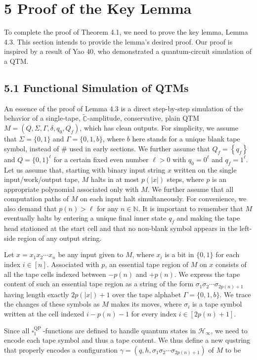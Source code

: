 \documentclass[10pt]{article}
\begin{document}
\section*{5 Proof of the Key Lemma}
To complete the proof of Theorem 4.1, we need to prove the key lemma, Lemma 4.3. This section intends to provide the lemma's desired proof. Our proof is inspired by a result of Yao 40, who demonstrated a quantum-circuit simulation of a QTM.

\subsection*{5.1 Functional Simulation of QTMs}
An essence of the proof of Lemma 4.3 is a direct step-by-step simulation of the behavior of a single-tape, $\tilde{\mathbb{C}}$-amplitude, conservative, plain QTM $M=\left(Q, \Sigma, \Gamma, \delta, q_{0}, Q_{f}\right)$, which has clean outputs. For simplicity, we assume that $\Sigma=\{0,1\}$ and $\Gamma=\{0,1, b\}$, where $b$ here stands for a unique blank tape symbol, instead of $\#$ used in early sections. We further assume that $Q_{f}=\left\{q_{f}\right\}$ and $Q=\{0,1\}^{\ell}$ for a certain fixed even number $\ell>0$ with $q_{0}=0^{\ell}$ and $q_{f}=1^{\ell}$. Let us assume that, starting with binary input string $x$ written on the single input/work/output tape, $M$ halts in at most $p(|x|)$ steps, where $p$ is an appropriate polynomial associated only with $M$. We further assume that all computation paths of $M$ on each input halt simultaneously. For convenience, we also demand that $p(n)>\ell$ for any $n \in \mathbb{N}$. It is important to remember that $M$ eventually halts by entering a unique final inner state $q_{f}$ and making the tape head stationed at the start cell and that no non-blank symbol appears in the left-side region of any output string.

Let $x=x_{1} x_{2} \cdots x_{n}$ be any input given to $M$, where $x_{i}$ is a bit in $\{0,1\}$ for each index $i \in[n]$. Associated with $p$, an essential tape region of $M$ on $x$ consists of all the tape cells indexed between $-p(n)$ and $+p(n)$. We express the tape content of such an essential tape region as a string of the form $\sigma_{1} \sigma_{2} \cdots \sigma_{2 p(n)+1}$ having length exactly $2 p(|x|)+1$ over the tape alphabet $\Gamma=\{0,1, b\}$. We trace the changes of these symbols as $M$ makes its moves, where $\sigma_{i}$ is a tape symbol written at the cell indexed $i-p(n)-1$ for every index $i \in[2 p(n)+1]$.

Since all $\square_{1}^{\text {QP }}$-functions are defined to handle quantum states in $\mathcal{H}_{\infty}$, we need to encode each tape symbol and thus a tape content. We thus define a new qustring that properly encodes a configuration $\gamma=\left(q, h, \sigma_{1} \sigma_{2} \cdots \sigma_{2 p(n)+1}\right)$ of $M$ to be
\end{document}
